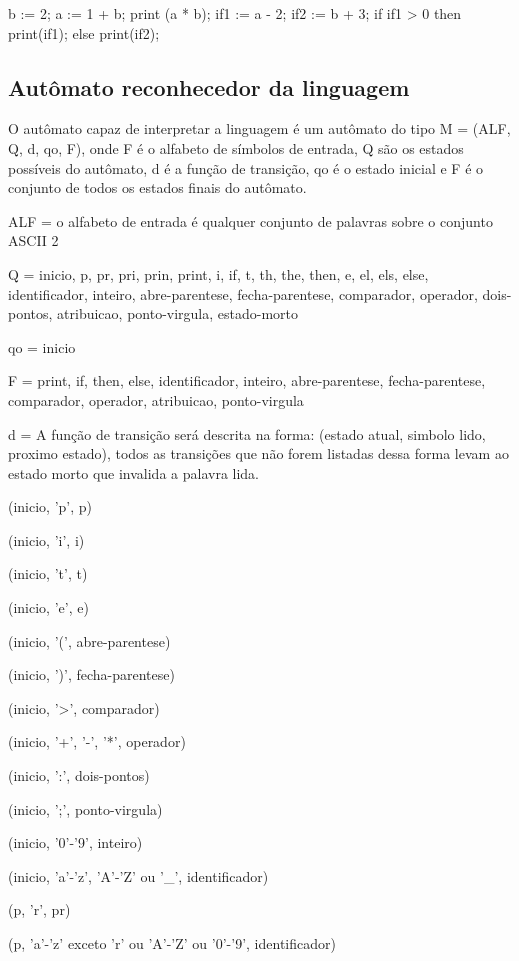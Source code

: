 \documentclass[12pt,a4paper,twoside]{report}
\begin{document}
\begin{terminal}
b := 2;
a := 1 + b;
print (a * b);
if1 := a - 2;
if2 := b + 3;
if if1 > 0
then print(if1);
else print(if2);
\end{terminal}


\subsection{Autômato reconhecedor da linguagem}
O autômato capaz de interpretar a linguagem é um autômato do tipo M = (ALF, Q, d, qo, F), onde F é o alfabeto de símbolos de entrada, Q são os estados possíveis do autômato, d é a função de transição, qo é o estado inicial e F é o conjunto de todos os estados finais do autômato.

ALF = o alfabeto de entrada é qualquer conjunto de palavras sobre o conjunto ASCII 2

Q = {inicio, p, pr, pri, prin, print, i, if, t, th, the, then, e, el, els, else, identificador, inteiro, abre-parentese, fecha-parentese, comparador, operador, dois-pontos, atribuicao, ponto-virgula, estado-morto}

qo = inicio

F = {print, if, then, else, identificador, inteiro, abre-parentese, fecha-parentese, comparador, operador, atribuicao, ponto-virgula}

d =
A função de transição será descrita na forma:
(estado atual, simbolo lido, proximo estado), todos as transições que não forem listadas dessa forma levam ao estado morto que invalida a palavra lida.

(inicio, 'p', p)

(inicio, 'i', i)

(inicio, 't', t)

(inicio, 'e', e)

(inicio, '(', abre-parentese)

(inicio, ')', fecha-parentese)

(inicio, '>', comparador)

(inicio, '+', '-', '*', operador)

(inicio, ':', dois-pontos)

(inicio, ';', ponto-virgula)

(inicio, '0'-'9', inteiro)

(inicio, 'a'-'z', 'A'-'Z' ou '\_', identificador)

(p, 'r', pr)

(p, 'a'-'z' exceto 'r' ou 'A'-'Z' ou '0'-'9', identificador)
\end{document}
